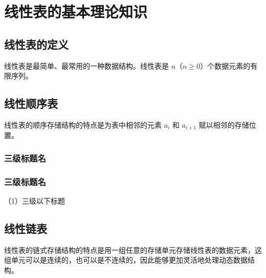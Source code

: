 \chapter{线性表的基本理论知识}

\section{线性表的定义}

线性表是最简单、最常用的一种数据结构。线性表\cite{yanwm-ds}是 \(n\)（\(n \ge 0\)）个数据元素的有限序列。

\section{线性顺序表}

线性表的顺序存储结构的特点是为表中相邻的元素 \(a_i\) 和 \(a_{i+1}\) 赋以相邻的存储位置。

\subsection{三级标题名}

\subsection{三级标题名}

{\upcbodybf\noindent （1）三级以下标题\par}

\section{线性链表}

线性表的链式存储结构的特点是用一组任意的存储单元存储线性表的数据元素，这组单元可以是连续的，也可以是不连续的，因此能够更加灵活地处理动态数据结构。
